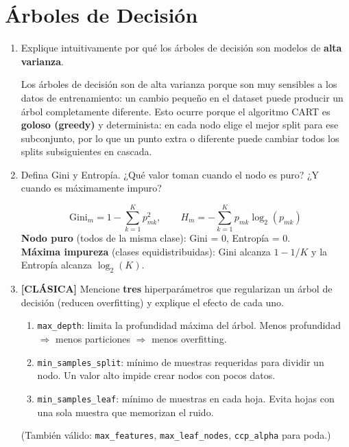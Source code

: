 \documentclass[11pt,a4paper]{article}
\begin{document}
\section{\'Arboles de Decisi\'on}

\begin{enumerate}[label=\textbf{P\arabic*.}, resume]

\item Explique intuitivamente por qu\'e los \'arboles de decisi\'on son modelos de
  \textbf{alta varianza}.

\begin{answerbox}
Los \'arboles de decisi\'on son de alta varianza porque son muy sensibles a los datos
de entrenamiento: un cambio peque\~no en el dataset puede producir un \'arbol
completamente diferente. Esto ocurre porque el algoritmo CART es \textbf{goloso (greedy)}
y determinista: en cada nodo elige el mejor split para ese subconjunto, por lo que un
punto extra o diferente puede cambiar todos los splits subsiguientes en cascada.
\end{answerbox}

\item Defina Gini y Entrop\'ia. ¿Qu\'e valor toman cuando el nodo es puro? ¿Y cuando es
  m\'aximamente impuro?

\begin{answerbox}
\[
  \text{Gini}_m = 1 - \sum_{k=1}^{K} p_{mk}^2, \qquad
  H_m = -\sum_{k=1}^{K} p_{mk}\log_2(p_{mk})
\]
\textbf{Nodo puro} (todos de la misma clase): Gini = 0, Entrop\'ia = 0.\\
\textbf{M\'axima impureza} (clases equidistribuidas): Gini alcanza $1 - 1/K$ y
la Entrop\'ia alcanza $\log_2(K)$.
\end{answerbox}

\item \leavevmode

\begin{classicbox}
\textcolor{tdred}{\textbf{[CL\'ASICA]}} Mencione \textbf{tres} hiperpar\'ametros que
regularizan un \'arbol de decisi\'on (reducen overfitting) y explique el efecto de cada
uno.
\end{classicbox}

\begin{answerbox}
\begin{enumerate}[label=\arabic*., topsep=2pt, itemsep=4pt]
  \item \texttt{max\_depth}: limita la profundidad m\'axima del \'arbol. Menos
    profundidad $\Rightarrow$ menos particiones $\Rightarrow$ menos overfitting.
  \item \texttt{min\_samples\_split}: m\'inimo de muestras requeridas para dividir
    un nodo. Un valor alto impide crear nodos con pocos datos.
  \item \texttt{min\_samples\_leaf}: m\'inimo de muestras en cada hoja. Evita hojas
    con una sola muestra que memorizan el ruido.
\end{enumerate}
(Tambi\'en v\'alido: \texttt{max\_features}, \texttt{max\_leaf\_nodes},
\texttt{ccp\_alpha} para poda.)
\end{answerbox}


\end{enumerate}
\end{document}
